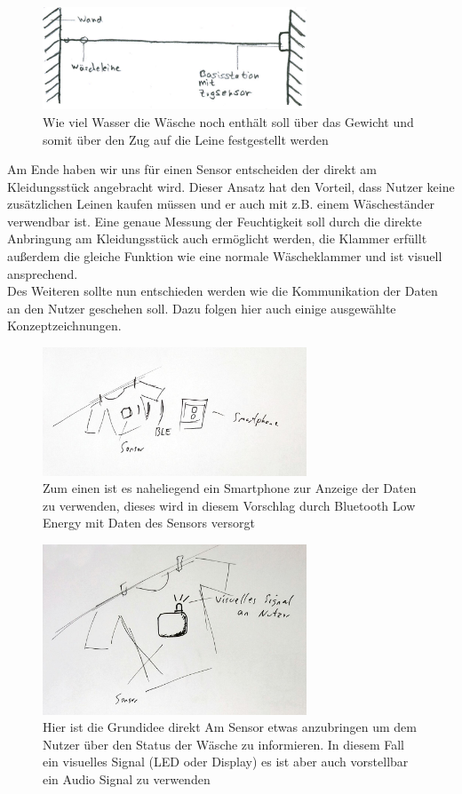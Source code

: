 \begin{figure}[htb] 
	\centerline{\includegraphics*[width=0.7\textwidth]{./10+10/Concept/07-zug}}
	\caption{Wie viel Wasser die Wäsche noch enthält soll über das Gewicht und somit über den Zug auf die Leine festgestellt werden}
	\label{10+10_zug}
\end{figure}
\FloatBarrier
Am Ende haben wir uns für einen Sensor entscheiden der direkt am Kleidungsstück angebracht wird. Dieser Ansatz hat den Vorteil, dass Nutzer keine zusätzlichen Leinen kaufen müssen und er auch mit z.B. einem Wäscheständer verwendbar ist. Eine genaue Messung der Feuchtigkeit soll durch die direkte Anbringung am Kleidungsstück auch ermöglicht werden, die Klammer erfüllt außerdem die gleiche Funktion wie eine normale Wäscheklammer und ist visuell ansprechend.
\\ Des Weiteren sollte nun entschieden werden wie die Kommunikation der Daten an den Nutzer geschehen soll. Dazu folgen hier auch einige ausgewählte Konzeptzeichnungen.
\begin{figure}[htb] 
	\centerline{\includegraphics*[width=0.7\textwidth]{./10+10/Detail/02_ble_app}}
	\caption{Zum einen ist es naheliegend ein Smartphone zur Anzeige der Daten zu verwenden, dieses wird in diesem Vorschlag durch Bluetooth Low Energy mit Daten des Sensors versorgt}
	\label{10+10_ble_app}
\end{figure}
\begin{figure}[htb] 
	\centerline{\includegraphics*[width=0.7\textwidth]{./10+10/Detail/03_visual_signal}}
	\caption{Hier ist die Grundidee direkt Am Sensor etwas anzubringen um dem Nutzer über den Status der Wäsche zu informieren. In diesem Fall ein visuelles Signal (LED oder Display) es ist aber auch vorstellbar ein Audio Signal zu verwenden}
	\label{10+10_visual_signal}
\end{figure}
